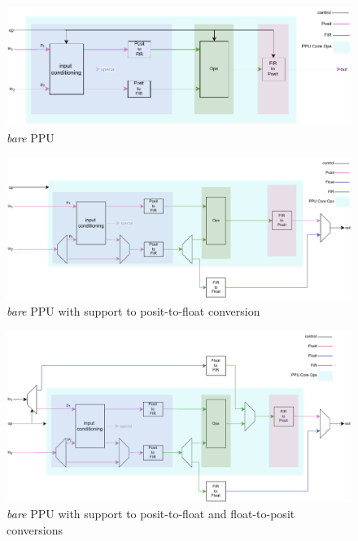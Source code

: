 \begin{figure}[H]
        \centering
        \includegraphics[width=1\textwidth]{figures/top_no_conversions.pdf}
        \caption{\textit{bare} PPU}
\end{figure}
\begin{figure}
        \includegraphics[width=1\textwidth]{figures/top_P2F.pdf}
        \caption{\textit{bare} PPU with support to posit-to-float conversion}
        \label{fig:top_p2f_00000001}
\end{figure}
\begin{figure}
        \includegraphics[width=1\textwidth]{figures/top_all.pdf}
        \caption{\textit{bare} PPU with support to posit-to-float and float-to-posit conversions}
\end{figure}



